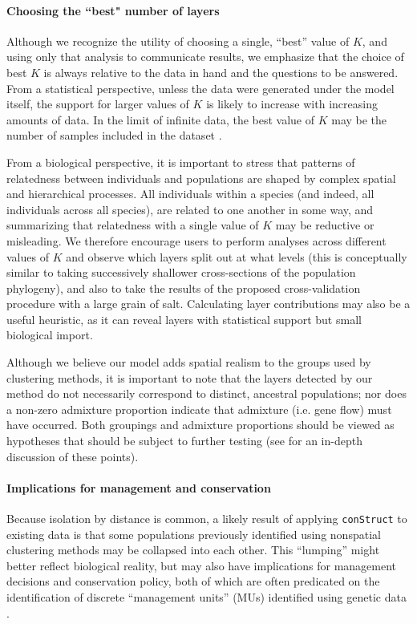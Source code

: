 \documentclass[10pt,letterpaper]{article}
\begin{document}
\paragraph{Choosing the ``best" number of layers}
Although we recognize the utility of choosing a single, ``best'' value of $K$, 
and using only that analysis to communicate results, 
we emphasize that 
the choice of best $K$ is always relative to the data in hand
and the questions to be answered.
From a statistical perspective, unless the data were generated under the model itself,
the support for larger values of $K$ is likely to increase with increasing amounts of data.
In the limit of infinite data, the best value of $K$ 
may be the number of samples included in the dataset \cite{Patterson2006}.

From a biological perspective, 
it is important to stress that patterns of relatedness between individuals and populations 
are shaped by complex spatial and hierarchical processes.
All individuals within a species (and indeed, all individuals across all species), 
are related to one another in some way, 
and summarizing that relatedness with a single value of $K$ may be reductive or misleading.
We therefore encourage users to perform analyses across different values of $K$ and 
observe which layers split out at what levels 
(this is conceptually similar to taking successively shallower
cross-sections of the population phylogeny), 
and also to take the results of the proposed cross-validation procedure with a large grain of salt.
Calculating layer contributions may also be a useful heuristic, 
as it can reveal layers with statistical support but small biological import.

Although we believe our model adds spatial realism to the groups used by clustering methods,
it is important to note that the layers detected by our method 
do not necessarily correspond  to distinct, ancestral populations; 
nor does a non-zero admixture proportion indicate that admixture 
(i.e. gene flow) must have occurred. 
Both groupings and admixture proportions
should be viewed as hypotheses that should be subject to further testing
(see \cite{Falush:16} for an in-depth discussion of these points).

\paragraph{Implications for management and conservation}
Because isolation by distance is common, 
a likely result of applying \texttt{conStruct} to existing data is that some
populations previously identified using nonspatial clustering methods 
may be collapsed into each other.  
This ``lumping'' might better reflect biological reality, 
but may also have implications for management decisions and conservation policy, 
both of which are often predicated on the identification of discrete ``management units'' (MUs) 
identified using genetic data \cite{Moritz1994,Waples_1998,Moritz_etal_2002}.
\end{document}
